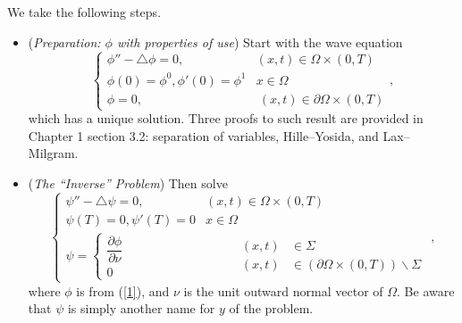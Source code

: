We take the following steps.
\begin{itemize}
\item
(\textit{Preparation: $\phi$ with properties of use}) Start with the wave equation
\begin{equation}\label{1}
    \left\{\begin{array}{l}
        \phi''-\triangle \phi=0, &\!\!(x,t)\in\Omega\times(0,T)\\
        \phi(0)=\phi^0,\phi'(0)=\phi^1 &\!\!\!\!\!\!\!\!\!\!\!\!\!\!x\in\Omega\\
        \phi=0, &\ (x,t)\in\partial\Omega\times(0,T)
    \end{array}\right.,
\end{equation}
which has a unique solution. Three proofs to such result 
are provided in \cite{L1} Chapter 1 section 3.2: 
separation of variables, Hille--Yosida, and Lax--Milgram.

\item (\textit{The \textcolor{ff3333}{``Inverse''} Problem}) Then solve
\begin{equation}\label{2}
    \left\{\begin{array}{l}
        \psi''-\triangle \psi=0, &\!\!(x,t)\in\Omega\times(0,T)\\
        \psi(T)=0,\psi'(T)=0 &\!\!\!\!\!\!\!\!\!\!\!\!\!\!x\in\Omega\\
        \psi=\begin{cases}\dfrac{\partial\phi}{\partial\nu}\\0\end{cases} &\qquad\ \ 
        \begin{aligned}
            (x,t)&\in\Sigma\\
            (x,t)&\in(\partial\Omega\times(0,T))\backslash\Sigma
        \end{aligned}\end{array}\right.,
\end{equation}
where $\phi$ is from (\ref{1}), 
and $\nu$ is the unit outward normal vector of $\Omega$. 
Be aware that $\psi$ is simply another name for $y$ of the problem.


\end{itemize}
